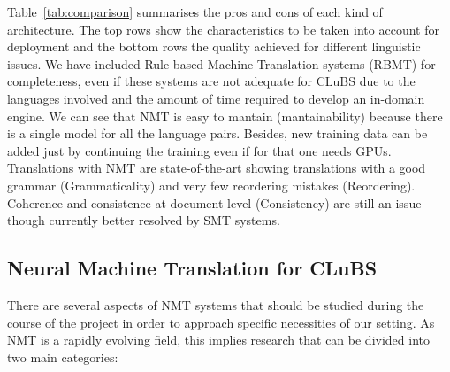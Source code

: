 \documentclass[a4paper,11pt]{article}
\begin{document}
Table~\ref{tab:comparison} summarises the pros and cons of each kind of architecture. The top rows show  the characteristics to be taken into account for deployment and the bottom rows the quality achieved for different linguistic issues. 
We have included Rule-based Machine Translation systems (RBMT) for completeness, even if these systems are not adequate for CLuBS due to the languages involved and the amount of time required to develop an in-domain engine.
We can see that NMT is easy to mantain (mantainability) because there is a single model for all the language pairs. Besides, new training data can be added just by continuing the training even if for that one needs GPUs.   
Translations with NMT are state-of-the-art showing translations with a good grammar (Grammaticality) and very few reordering mistakes (Reordering). Coherence and consistence at document level (Consistency) are still an issue though currently better resolved by SMT systems. 

% 



\subsection{Neural Machine Translation for CLuBS}
\label{ss:system}

There are several aspects of NMT systems that should be studied during the course of the project in order to approach specific necessities of our setting. As NMT is a rapidly evolving field, this implies research that can be divided into two main categories: 
\end{document}
